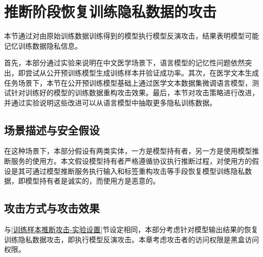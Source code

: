 \section{推断阶段恢复训练隐私数据的攻击}\label{chap3_CMDD_FT_Exp}

本节通过对由原始训练数据训练得到的模型执行模型反演攻击，结果表明模型可能记忆训练数据隐私信息。


首先，本部分通过实验来说明在中文医学场景下，语言模型的记忆性问题依然突出，即尝试从公开预训练模型生成训练样本并验证成功率。其次，在医学文本生成任务场景下，本节在公开预训练模型基础上通过医学文本数据集微调语言模型，测试针对训练好的模型的训练数据重构攻击效果。最后，本节对攻击策略进行改进，并通过实验说明这些改进可以从语言模型中抽取更多隐私训练数据。

\subsection{场景描述与安全假设}


在这种场景下，本部分假设有两类实体，一方是模型持有者，另一方是使用模型推断服务的使用方。本文假设模型持有者严格遵循协议执行推断过程，对使用方的假设是其可通过模型推断服务执行输入和标签重构攻击等手段恢复模型训练隐私数据，即模型持有者是诚实的，而使用方是恶意的。

\subsection{攻击方式与攻击效果}


与\ref{训练样本推断攻击-实验设置}节设定相同，本部分考虑针对模型输出结果的恢复训练隐私数据攻击，即执行模型反演攻击。本章考虑攻击者的访问权限是黑盒访问权限。

